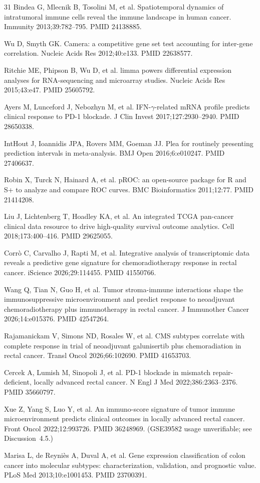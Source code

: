 \documentclass[11pt,a4paper]{article}
\begin{document}
\begin{thebibliography}{31}
 Bindea G, Mlecnik B, Tosolini M, et al. Spatiotemporal dynamics of intratumoral immune cells reveal the immune landscape in human cancer. Immunity 2013;39:782--795. PMID 24138885.

 Wu D, Smyth GK. Camera: a competitive gene set test accounting for inter-gene correlation. Nucleic Acids Res 2012;40:e133. PMID 22638577.

 Ritchie ME, Phipson B, Wu D, et al. limma powers differential expression analyses for RNA-sequencing and microarray studies. Nucleic Acids Res 2015;43:e47. PMID 25605792.

 Ayers M, Lunceford J, Nebozhyn M, et al. IFN-$\gamma$-related mRNA profile predicts clinical response to PD-1 blockade. J Clin Invest 2017;127:2930--2940. PMID 28650338.

 IntHout J, Ioannidis JPA, Rovers MM, Goeman JJ. Plea for routinely presenting prediction intervals in meta-analysis. BMJ Open 2016;6:e010247. PMID 27406637.

 Robin X, Turck N, Hainard A, et al. pROC: an open-source package for R and S+ to analyze and compare ROC curves. BMC Bioinformatics 2011;12:77. PMID 21414208.

 Liu J, Lichtenberg T, Hoadley KA, et al. An integrated TCGA pan-cancer clinical data resource to drive high-quality survival outcome analytics. Cell 2018;173:400--416. PMID 29625055.

 Corr\`o C, Carvalho J, Rapti M, et al. Integrative analysis of transcriptomic data reveals a predictive gene signature for chemoradiotherapy response in rectal cancer. iScience 2026;29:114455. PMID 41550766.

 Wang Q, Tian N, Guo H, et al. Tumor stroma-immune interactions shape the immunosuppressive microenvironment and predict response to neoadjuvant chemoradiotherapy plus immunotherapy in rectal cancer. J Immunother Cancer 2026;14:e015376. PMID 42547264.

 Rajamanickam V, Simons ND, Rosales W, et al. CMS subtypes correlate with complete response in trial of neoadjuvant galunisertib plus chemoradiation in rectal cancer. Transl Oncol 2026;66:102690. PMID 41653703.

 Cercek A, Lumish M, Sinopoli J, et al. PD-1 blockade in mismatch repair-deficient, locally advanced rectal cancer. N Engl J Med 2022;386:2363--2376. PMID 35660797.

 Xue Z, Yang S, Luo Y, et al. An immuno-score signature of tumor immune microenvironment predicts clinical outcomes in locally advanced rectal cancer. Front Oncol 2022;12:993726. PMID 36248969. (GSE39582 usage unverifiable; see Discussion~4.5.)

 Marisa L, de Reyni\`es A, Duval A, et al. Gene expression classification of colon cancer into molecular subtypes: characterization, validation, and prognostic value. PLoS Med 2013;10:e1001453. PMID 23700391.

\end{thebibliography}
\end{document}
